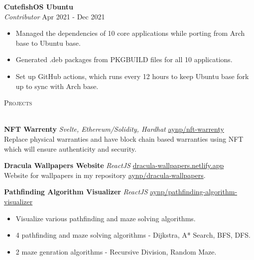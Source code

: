 \documentclass[a4paper]{article}
\newcommand{\lineunder} {
    \vspace*{-8pt} \\
    \hspace*{-18pt} \hrulefill \\
}
\newcommand{\header} [1] {
    {\hspace*{-18pt}\vspace*{6pt} \textsc{#1}}
    \vspace*{-6pt} \lineunder
}
\begin{document}
\vspace{-1mm}
\textbf{CutefishOS Ubuntu}\\
\textit{Contributor} \hfill Apr 2021 - Dec 2021\\
\vspace{-2mm}
\begin{itemize} \itemsep -2pt
	\item Managed the dependencies of 10 core applications while porting from Arch base to Ubuntu base.
	\item Generated .deb packages from PKGBUILD files for all 10 applications.
	\item Set up GitHub actions, which runs every 12 hours to keep Ubuntu base fork up to sync with Arch base.
\end{itemize}



\header{Projects}
\vspace{1mm}

{\textbf{NFT Warrenty}} {\sl Svelte, Ethereum/Solidity, Hardhat} \hfill \href{https://github.com/aynp/nft-warrenty}{aynp/nft-warrenty}\\

Replace physical warranties and have block chain based warranties using NFT which will ensure authenticity and security.\\
\vspace*{2mm}

{\textbf{Dracula Wallpapers Website}} {\sl ReactJS} \hfill \href{https://dracula-wallpapers.netlify.app/}{dracula-wallpapers.netlify.app}\\
Website for wallpapers in my repository \href{https://github.com/aynp/dracula-wallpapers}{aynp/dracula-wallpapers}.\\
\vspace*{2mm}

{\textbf{Pathfinding Algorithm Visualizer}} {\sl ReactJS} \hfill \href{https://github.com/aynp/pathfinding-algorithm-visualizer}{aynp/pathfinding-algorithm-visualizer}\\
\vspace{-2mm}
\begin{itemize} \itemsep -2pt
	\item Visualize various pathfinding and maze solving algorithms.
	\item 4 pathfinding and maze solving algorithms - Dijkstra, A* Search, BFS, DFS.
	\item 2 maze genration algorithms - Recursive Division, Random Maze.
\end{itemize}
\vspace*{2mm}
\end{document}
